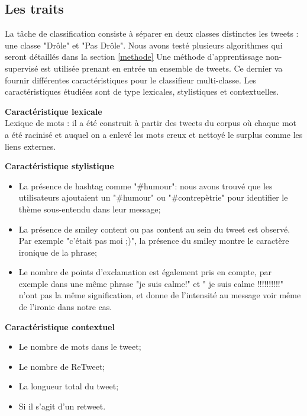 \documentclass[10pt,a4paper,twoside]{article}
\begin{document}
\subsection{Les traits}
\label{features}
La tâche de classification consiste à séparer en deux classes distinctes les tweets : une classe "Drôle" et "Pas Drôle". Nous avons testé plusieurs algorithmes qui seront détaillés dans la section \ref{methode}
Une méthode d'apprentissage non-supervisé est utilisée prenant en entrée un ensemble de tweets. Ce dernier va fournir différentes caractéristiques pour le classifieur multi-classe. Les caractéristiques étudiées sont de type lexicales, stylistiques et contextuelles. 

\textbf{Caractéristique lexicale}\\
Lexique de mots : il a été construit à partir des tweets du corpus où chaque mot a été racinisé et auquel on a enlevé les mots creux et nettoyé le surplus comme les liens externes.
\vspace{0.5cm}

\textbf{Caractéristique stylistique}
\begin{itemize}
\item La présence de hashtag comme "\#humour": nous avons trouvé que les utilisateurs ajoutaient un "\#humour" ou "\#contrepètrie" pour identifier le thème sous-entendu dans leur message;
\item La présence de smiley content ou pas content au sein du tweet est observé. Par exemple "c'était pas moi ;)", la présence du smiley montre le caractère ironique de la phrase;
\item Le nombre de points d'exclamation est également pris en compte, par exemple dans une même phrase "je suis calme!" et " je suis calme !!!!!!!!!!" n'ont pas la même signification, et donne de l'intensité au message voir même de l'ironie dans notre cas. 
\end{itemize}
\vspace{0.5cm}

\textbf{Caractéristique contextuel}
\begin{itemize}
\item Le nombre de mots dans le tweet;
\item Le nombre de ReTweet;
\item La longueur total du tweet;
\item Si il s'agit d'un retweet.
\end{itemize}
\vspace{0.5cm}
\end{document}

